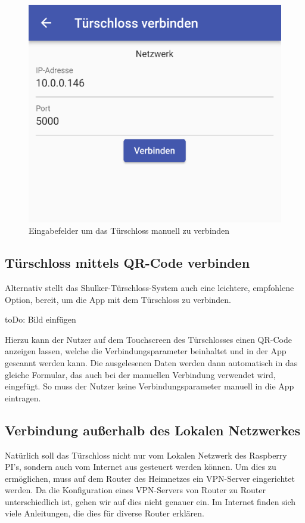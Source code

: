 \begin{figure}[H]
    \begin{center}
        \includegraphics[width=.5\textwidth]{images/mobile/ManualConnect.png}
        \caption{Eingabefelder um das Türschloss manuell zu verbinden}
    \end{center}
\end{figure}

\subsection{Türschloss mittels QR-Code verbinden}
Alternativ stellt das Shulker-Türschloss-System auch eine leichtere, empfohlene Option, bereit, um die App mit dem Türschloss
zu verbinden.

toDo: Bild einfügen

Hierzu kann der Nutzer auf dem Touchscreen des Türschlosses einen QR-Code anzeigen lassen, welche die Verbindungsparameter
beinhaltet und in der App gescannt werden kann. Die ausgelesenen Daten werden dann automatisch in das gleiche Formular,
das auch bei der manuellen Verbindung verwendet wird, eingefügt. So muss der Nutzer keine Verbindungsparameter manuell
in die App eintragen.

\subsection{Verbindung außerhalb des Lokalen Netzwerkes}
Natürlich soll das Türschloss nicht nur vom Lokalen Netzwerk des Raspberry PI's, sondern auch vom Internet aus 
gesteuert werden können.
Um dies zu ermöglichen, muss auf dem Router des Heimnetzes ein VPN-Server eingerichtet werden.
Da die Konfiguration eines VPN-Servers von Router zu Router unterschiedlich ist, gehen wir auf dies nicht genauer ein.
Im Internet finden sich viele Anleitungen, die dies für diverse Router erklären.
\pagebreak
